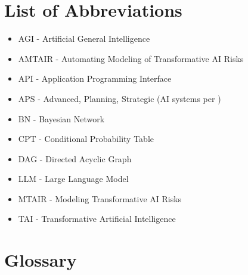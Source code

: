 \documentclass[
  11pt,
  letterpaper,
]{book}
\providecommand{\tightlist}{%
  \setlength{\itemsep}{0pt}\setlength{\parskip}{0pt}}
\begin{document}
\section*{List of Abbreviations}\label{list-of-abbreviations}


\begin{itemize}
\tightlist
\item
  AGI - Artificial General Intelligence
\item
  AMTAIR - Automating Modeling of Transformative AI Risks
\item
  API - Application Programming Interface
\item
  APS - Advanced, Planning, Strategic (AI systems per
  \textcite{carlsmith2021})
\item
  BN - Bayesian Network
\item
  CPT - Conditional Probability Table
\item
  DAG - Directed Acyclic Graph
\item
  LLM - Large Language Model
\item
  MTAIR - Modeling Transformative AI Risks
\item
  TAI - Transformative Artificial Intelligence
\end{itemize}

\section*{Glossary}\label{glossary}

\end{document}
